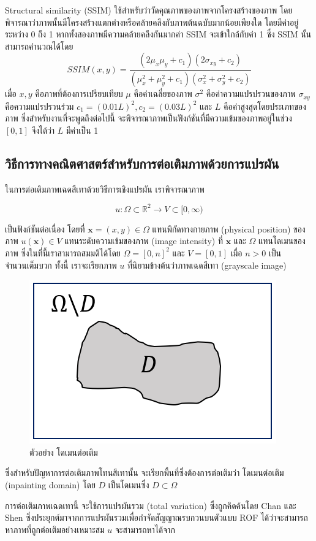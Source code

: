 \documentclass[hidelinks,a4paper,14pt]{article}
\numberwithin{equation}{section}							%
\begin{document}
{	\hspace{1cm} Structural similarity (SSIM)  \cite{ref:SSIM} ใช้สำหรับว่าวัดคุณภาพของภาพจากโครงสร้างของภาพ โดยพิจารณาว่าภาพนั้นมีโครงสร้างแตกต่างหรือคล้ายคลึงกับภาพต้นฉบับมากน้อยเพียงใด โดยมีค่าอยู่ระหว่าง 0 ถึง 1 หากทั้งสองภาพมีความคล้ายคลึงกันมากค่า SSIM  จะเข้าใกล้กับค่า 1 ซึ่ง SSIM นั้นสามารถคำนวณได้โดย
		$$ SSIM(x,y) = \frac{(2\mu_x\mu_y + c_1)(2\sigma_{xy} + c_2)}{(\mu_x^2+\mu_y^2+c_1)(\sigma_x^2+\sigma_y^2+c_2)}$$
	เมื่อ $x,y$ คือภาพที่ต้องการเปรียบเทียบ $\mu$ คือค่าเฉลี่ยของภาพ $\sigma^2$ คือค่าความแปรปรวนของภาพ $\sigma_{xy}$ คือความแปรปรวนร่วม $c_1 =  (0.01L)^2, c_2 = (0.03L)^2$ และ $L$ คือค่าสูงสุดโดยประเภทของภาพ ซึ่งสำหรับงานที่จะพูดถึงต่อไปนี้ จะพิจารณาภาพเป็นฟังก์ชันที่มีความเข้มของภาพอยู่ในช่วง $ [0,1] $ จึงได้ว่า $L$ มีค่าเป็น 1


\subsection{วิธีการทางคณิตศาสตร์สำหรับการต่อเติมภาพด้วยการแปรผัน}
ในการต่อเติมภาพเฉดสีเทาด้วยวิธีการเชิงแปรผัน เราพิจารณาภาพ

$$ u : \Omega \subset \mathbb{R}^2 \rightarrow V \subset [0,\infty) $$

เป็นฟังก์ชันต่อเนื่อง โดยที่ $ \mathbf{x} = (x,y) \in \Omega $ แทนพิกัดทางกายภาพ (physical position) ของภาพ $ u(\mathbf{x}) \in V $ แทนระดับความเข้มของภาพ (image intensity) ที่ $ \mathbf{x} $ และ $ \Omega $ แทนโดเมนของภาพ ซึ่งในที่นี้เราสามารถสมมติได้โดย $ \Omega = [0,n]^2 $ และ $ V = [0,1] $ เมื่อ $n>0$ เป็นจำนวนเต็มบวก ทั้งนี้ เราจะเรียกภาพ $u$ ที่นิยามข้างต้นว่าภาพเฉดสีเทา (grayscale image)
\begin{figure}[H]
	\centering
	\includegraphics[width=0.4\linewidth]{images/sample-domain.png}
	\caption{ตัวอย่าง โดเมนต่อเติม}
\end{figure}
ซึ่งสำหรับปัญหาการต่อเติมภาพโทนสีเทานั้น จะเรียกพื้นที่ซึ่งต้องการต่อเติมว่า โดเมนต่อเติม (inpainting domain) โดย $D$ เป็นโดเมนซึ่ง $D \subset \Omega$ 

\hspace{1cm}การต่อเติมภาพเฉดเทานี้ จะใช้การแปรผันรวม (total variation) ซึ่งถูกคิดค้นโดย Chan และ Shen \cite{ref:rof-inpaint-chan-shen} ซึ่งประยุกต์มาจากการแปรผันรวมเพื่อกำจัดสัญญาณรบกวนบนตัวแบบ ROF \cite{ref:ROF-template} ได้ว่าจะสามารถหาภาพที่ถูกต่อเติมอย่างเหมาะสม $u$ จะสามารถหาได้จาก

}
\end{document}
